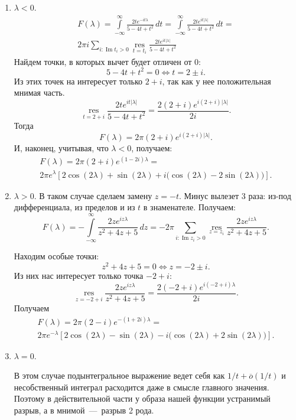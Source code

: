 \documentclass[12pt, a4paper]{article} %
\DeclareMathOperator*{\res}{res}
\DeclareMathOperator{\normim}{Im}
\renewcommand{\Im}{\normim}
\begin{document}
\begin{enumerate}
\item $\lambda < 0$.
    \begin{multline*}
        F(\lambda) =
        \int\limits_{-\infty}^{\infty}
           \frac{2te^{-it\lambda}}{5 - 4t + t^2}\,dt =
        \int\limits_{-\infty}^{\infty}
           \frac{2te^{it\lvert \lambda \rvert}}{5-4t+t^2}\,dt =\\
           2\pi i \sum\limits_{i\colon \Im t_i > 0} \res\limits_{t=t_i}{\frac{2te^{it\lvert \lambda \rvert}}{5-4t+t^2}}        
    \end{multline*}
    Найдем точки, в которых вычет будет отличен от $0$:
     \[
        5 - 4t + t^2 = 0 \iff t = 2 \pm i
    .\] 
    Из этих точек на интересует только $2 + i$, так как у нее положительная
    мнимая часть.
    \[
        \res\limits_{t=2+i} \frac{2te^{it\lvert \lambda \rvert }}{5-4t+t^2} =
        \frac{2(2+i)e^{i(2+i)\lvert \lambda \rvert}}{2i}
    .\] 
    Тогда
    \[
        F(\lambda) = 2\pi(2+i)e^{i(2+i)\lvert \lambda \rvert}
    .\] 
    И, наконец, учитывая, что $\lambda < 0$, получаем:
\begin{multline*}
        F(\lambda) = 2\pi(2+i)e^{(1-2i)\lambda} =\\
        2\pi e^\lambda\left[ 2\cos(2\lambda) + \sin(2\lambda) +
        i\bigl( \cos(2\lambda) - 2\sin(2\lambda) \bigr)\right]
.\end{multline*}

\item $\lambda > 0$.
    В таком случае сделаем замену $z = -t$.
    Минус вылезет 3 раза: из-под дифференциала, из пределов и из $t$ в знаменателе.
    Получаем:
     \[
        F(\lambda) = -\int\limits_{-\infty}^{\infty} 
            \frac{2ze^{iz\lambda}}{z^2 + 4z + 5}\,dz =
        -2\pi \sum\limits_{i\colon \Im z_i > 0} \res\limits_{z=z_i}
            \frac{2ze^{iz\lambda}}{z^2 + 4z + 5}
    .\] 

    Находим особые точки:
    \[
        z^2 + 4z + 5 = 0 \iff z = -2 \pm i
    .\] 
    Из них нас интересует только точка $-2 + i$:
     \[
        \res\limits_{z = -2+i} \frac{2ze^{iz\lambda}}{z^2 + 4z + 5} =
        \frac{2(-2+i)e^{i(-2+i)\lambda}}{2i}
    .\] 
    Получаем 
    \begin{multline*}
        F(\lambda) = 2\pi (2 - i)e^{-(1+2i)\lambda} =\\
        2\pi e^{-\lambda}\left[ 2\cos(2\lambda) - \sin(2\lambda) 
        -i \bigl( \cos(2\lambda) + 2\sin(2\lambda) \bigr)\right]
    .\end{multline*}
    
\item $\lambda = 0$.

    В этом случае подынтегральное выражение ведет себя как 
    $1\!/ t + \overline{o}(1\!/ t)$ и несобственный интеграл расходится
    даже в смысле главного значения.
    Поэтому в действительной части у образа нашей функции устранимый разрыв,
    а в мнимой~---~разрыв 2 рода.
\end{enumerate} 
\end{document}
